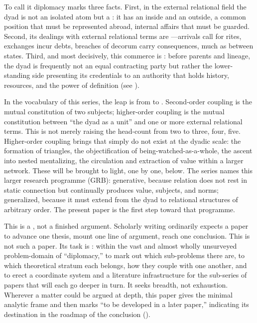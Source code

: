 To call it diplomacy marks three facts. First, in the external relational field the dyad is not an isolated atom but a : it has an inside and an outside, a common position that must be represented abroad, internal affairs that must be guarded. Second, its dealings with external relational terms are ---arrivals call for rites, exchanges incur debts, breaches of decorum carry consequences, much as between states. Third, and most decisively, this commerce is : before parents and lineage, the dyad is frequently not an equal contracting party but rather the lower-standing side presenting its credentials to an authority that holds history, resources, and the power of definition (see ).

In the vocabulary of this series, the leap is from  to . Second-order coupling is the mutual constitution of two subjects; higher-order coupling is the mutual constitution between ``the dyad as a unit'' and one or more external relational terms. This is not merely raising the head-count from two to three, four, five. Higher-order coupling brings  that simply do not exist at the dyadic scale: the formation of triangles, the objectification of being-watched-as-a-whole, the ascent into nested mentalizing, the circulation and extraction of value within a larger network. These will be brought to light, one by one, below. The series names this larger research programme  (GRB): generative, because relation does not rest in static connection but continually produces value, subjects, and norms; generalized, because it must extend from the dyad to relational structures of arbitrary order. The present paper is the first step toward that programme.

 This is a , not a finished argument. Scholarly writing ordinarily expects a paper to advance one thesis, mount one line of argument, reach one conclusion. This is not such a paper. Its task is : within the vast and almost wholly unsurveyed problem-domain of ``diplomacy,'' to mark out which sub-problems there are, to which theoretical stratum each belongs, how they couple with one another, and to erect a coordinate system and a literature infrastructure for the sub-series of papers that will each go deeper in turn. It seeks breadth, not exhaustion. Wherever a matter could be argued at depth, this paper gives the minimal analytic frame and then marks ``to be developed in a later paper,'' indicating its destination in the roadmap of the conclusion ().

